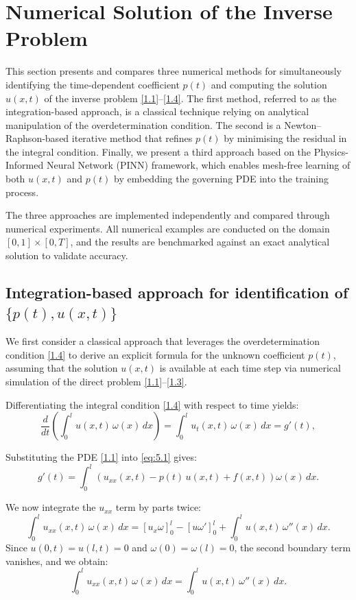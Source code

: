 \documentclass[reqno]{amsart}
\begin{document}
\section{Numerical Solution of the Inverse Problem}\label{5}

This section presents and compares three numerical methods for simultaneously identifying the time-dependent coefficient \( p(t) \) and computing the solution \( u(x,t) \) of the inverse problem \eqref{1.1}–\eqref{1.4}. The first method, referred to as the integration-based approach, is a classical technique relying on analytical manipulation of the overdetermination condition. The second is a Newton–Raphson-based iterative method that refines \( p(t) \) by minimising the residual in the integral condition. Finally, we present a third approach based on the Physics-Informed Neural Network (PINN) framework, which enables mesh-free learning of both \( u(x,t) \) and \( p(t) \) by embedding the governing PDE into the training process.

The three approaches are implemented independently and compared through numerical experiments. All numerical examples are conducted on the domain \( [0,1] \times [0,T] \), and the results are benchmarked against an exact analytical solution to validate accuracy.

\subsection{Integration-based approach for identification of \texorpdfstring{$\{p(t), u(x,t)\}$}{p(t), u(x,t)}}

We first consider a classical approach that leverages the overdetermination condition \eqref{1.4} to derive an explicit formula for the unknown coefficient \( p(t) \), assuming that the solution \( u(x,t) \) is available at each time step via numerical simulation of the direct problem \eqref{1.1}–\eqref{1.3}.

Differentiating the integral condition \eqref{1.4} with respect to time yields:
\begin{equation}\label{eq:5.1}
\frac{d}{dt} \left( \int_0^l u(x,t)\, \omega(x)\, dx \right)
= \int_0^l u_t(x,t)\, \omega(x)\, dx = g'(t),
\end{equation}

Substituting the PDE \eqref{1.1} into \eqref{eq:5.1} gives:
\[
g'(t) = \int_0^l \left( u_{xx}(x,t) - p(t)\, u(x,t) + f(x,t) \right) \omega(x)\, dx.
\]

We now integrate the \( u_{xx} \) term by parts twice:
\[
\int_0^l u_{xx}(x,t)\, \omega(x)\, dx
= \left[ u_x \omega \right]_0^l - \left[ u \omega' \right]_0^l + \int_0^l u(x,t)\, \omega''(x)\, dx.
\]
Since \( u(0,t) = u(l,t) = 0 \) and \( \omega(0) = \omega(l) = 0 \), the second boundary term vanishes, and we obtain:
\[
\int_0^l u_{xx}(x,t)\, \omega(x)\, dx =  \int_0^l u(x,t)\, \omega''(x)\, dx.
\]
\end{document}
